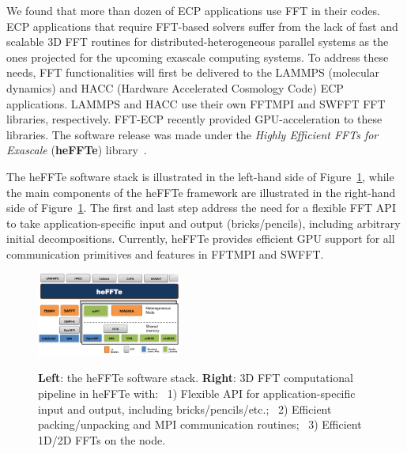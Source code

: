 We found that more than dozen of ECP applications use FFT in their codes.
ECP applications that require FFT-based solvers suffer from the lack of 
fast and scalable 3D FFT routines for distributed-heterogeneous parallel 
systems as the ones projected for the upcoming exascale computing systems. 
To address these needs, FFT functionalities will first be delivered 
to the LAMMPS (molecular dynamics) and HACC (Hardware Accelerated
Cosmology Code) ECP applications. 
LAMMPS and HACC use their own FFTMPI and SWFFT FFT libraries, respectively.
FFT-ECP recently provided GPU-acceleration to these libraries.
The software release was made under the {\it Highly Efficient FFTs for Exascale}
({\bf heFFTe}) library~\cite{thasd19}.

The heFFTe software stack is illustrated in the left-hand side of Figure~\ref{fig:fft-ecp-pipeline}, 
while the main components of the heFFTe framework are illustrated in the right-hand side of
Figure~\ref{fig:fft-ecp-pipeline}. The first and last step address the need 
for a flexible FFT API to take application-specific input and output (bricks/pencils), 
including arbitrary initial decompositions. Currently, heFFTe provides efficient
GPU support for all communication primitives and features in FFTMPI and SWFFT.
 
\begin{figure}[htb]
    \centering
    \includegraphics[width=0.42\textwidth]{projects/2.3.3-MathLibs/2.3.3.13-CLOVER/heffte}~~
    \caption{\label{fig:fft-ecp-pipeline}
    {\bf Left}: the heFFTe software stack. {\bf Right}: 3D FFT computational pipeline in heFFTe with:~
      1) Flexible API for application-specific input and output,
         including bricks/pencils/etc.;~
      2) Efficient packing/unpacking and MPI communication
         routines;~
      3) Efficient 1D/2D FFTs on the node.}
\end{figure}

